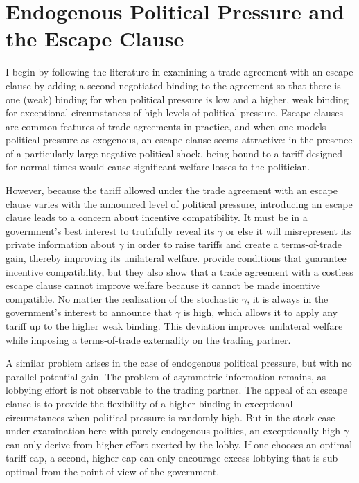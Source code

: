 \documentclass[12pt]{article}
\newcommand{\ga}{\gamma}
\begin{document}
\section{Endogenous Political Pressure and the Escape Clause}
\label{sec:escape}
I begin by following the literature in examining a trade agreement with an escape clause by adding a second negotiated binding to the agreement so that there is one (weak) binding for when political pressure is low and a higher, weak binding for exceptional circumstances of high levels of political pressure. Escape clauses are common features of trade agreements in practice, and when one models political pressure as exogenous, an escape clause seems attractive: in the presence of a particularly large negative political shock, being bound to a tariff designed for normal times would cause significant welfare losses to the politician.

However, because the tariff allowed under the trade agreement with an escape clause varies with the announced level of political pressure, introducing an escape clause leads to a concern about incentive compatibility. It must be in a government's best interest to truthfully reveal its $\ga$ or else it will misrepresent its private information about $\ga$ in order to raise tariffs and create a terms-of-trade gain, thereby improving its unilateral welfare. \Textcite{bs2005} provide conditions that guarantee incentive compatibility, but they also show that a trade agreement with a costless escape clause cannot improve welfare because it cannot be made incentive compatible. No matter the realization of the stochastic $\ga$, it is always in the government's interest to announce that $\ga$ is high, which allows it to apply any tariff up to the higher weak binding. This deviation improves unilateral welfare while imposing a terms-of-trade externality on the trading partner.

A similar problem arises in the case of endogenous political pressure, but with no parallel potential gain. The problem of asymmetric information remains, as lobbying effort is not observable to the trading partner. The appeal of an escape clause is to provide the flexibility of a higher binding in exceptional circumstances when political pressure is randomly high. But in the stark case under examination here with purely endogenous politics, an exceptionally high $\ga$ can only derive from higher effort exerted by the lobby. If one chooses an optimal tariff cap, a second, higher cap can only encourage excess lobbying that is sub-optimal from the point of view of the government.
\end{document}
